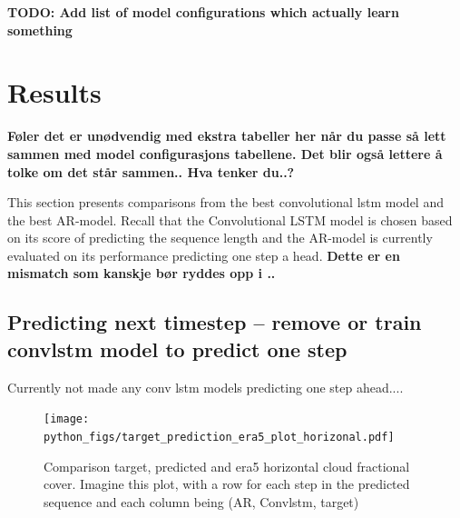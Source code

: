 \textbf{TODO: Add list of model configurations which actually learn something}
\begin{table}[]
    \centering
    \caption{Configuration of traninable convolutional lstm models. \textbf{r2 er veldig merkelig foreløbig, includere mae?}}
    \label{tab:convlstm_config}
\end{table}

\section{Results}
\textbf{Føler det er unødvendig med ekstra tabeller her når du passe så lett sammen med model configurasjons tabellene. Det blir også lettere å tolke om det står sammen.. Hva tenker du..? }

This section presents comparisons from the best convolutional lstm model and the best AR-model. Recall that the Convolutional LSTM model is chosen based on its score of predicting the sequence length and the AR-model is currently evaluated on its performance predicting one step a head. \textbf{Dette er en mismatch som kanskje bør ryddes opp i ..}

\subsection{Predicting next timestep -- remove or train convlstm model to predict one step}
Currently not made any conv lstm models predicting one step ahead....
\begin{figure}[ht]
    \centering
    \texttt{[image: python\_figs/target\_prediction\_era5\_plot\_horizonal.pdf]}
    \caption{Comparison target, predicted and era5 horizontal cloud fractional cover. Imagine this plot, with a row for each step in the predicted sequence and each column being (AR, Convlstm, target)}
    \label{fig:target_predict_era5_horizontal}
\end{figure}



